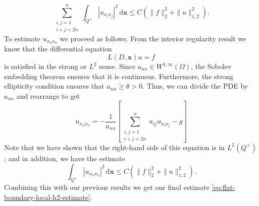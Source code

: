 \begin{Proof}
\begin{equation}\label{eq:flat-boundary-mixed-second-derivative-bound}
\sum_{\substack{i,j=1\\i+j<2n}}^n\int_{Q^+}|u_{x_ix_j}|^2\,\mathrm{d}\bm{x}\leq C(\|f\|_2^2+\|u\|_{1,2}^2).
\end{equation}
To estimate $u_{x_nx_n}$ we proceed as follows. From the interior regularity result we know that the differential equation\[L(D,\bm{x})u=f\]is satisfied in the strong or $L^2$ sense. Since $a_{nn}\in W^{1,\infty}(\Omega)$, the Sobolev embedding theorem ensures that it is continuous. Furthermore, the strong ellipticity condition ensures that $a_{nn}\geq\theta>0$. Thus, we can divide the PDE by $a_{nn}$ and rearrange to get
\begin{equation}\label{eq:flat-boundary-normal-second-derivative-recovery}
u_{x_nx_n}=-\frac{1}{a_{nn}}\left[\sum_{\substack{i,j=1\\i+j<2n}}^na_{ij}u_{x_ix_j}-g\right]
\end{equation}
Note that we have shown that the right-hand side of this equation is in $L^2(Q^+)$; and in addition, we have the estimate
\begin{equation}\label{eq:flat-boundary-normal-second-derivative-bound}
\int_{Q^+}|u_{x_nx_n}|^2\,\mathrm{d}\bm{x}\leq C(\|f\|_2^2+\|u\|_{1,2}^2).
\end{equation}
Combining this with our previous results we get our final estimate \eqref{eq:flat-boundary-local-h2-estimate}.
\end{Proof}
\endgroup
\endgroup
